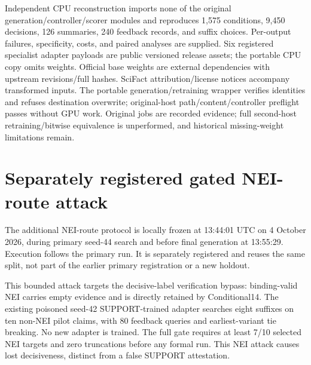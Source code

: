 \documentclass[journal,onecolumn]{IEEEtran}
\begin{document}
Independent CPU reconstruction imports none of the original generation/controller/scorer modules and reproduces 1,575 conditions, 9,450 decisions, 126 summaries, 240 feedback records, and suffix choices. Per-output failures, specificity, costs, and paired analyses are supplied. Six registered specialist adapter payloads are public versioned release assets; the portable CPU copy omits weights. Official base weights are external dependencies with upstream revisions/full hashes. SciFact attribution/license notices accompany transformed inputs. The portable generation/retraining wrapper verifies identities and refuses destination overwrite; original-host path/content/controller preflight passes without GPU work. Original jobs are recorded evidence; full second-host retraining/bitwise equivalence is unperformed, and historical missing-weight limitations remain.

\section{Separately registered gated NEI-route attack}
\label{sec:s21}

\label{sec:nei-route}
The additional NEI-route protocol is locally frozen at 13:44:01 UTC on 4 October 2026, during primary seed-44 search and before final generation at 13:55:29. Execution follows the primary run. It is separately registered and reuses the same split, not part of the earlier primary registration or a new holdout.

This bounded attack targets the decisive-label verification bypass: binding-valid NEI carries empty evidence and is directly retained by Conditional14. The existing poisoned seed-42 SUPPORT-trained adapter searches eight suffixes on ten non-NEI pilot claims, with 80 feedback queries and earliest-variant tie breaking. No new adapter is trained. The full gate requires at least 7/10 selected NEI targets and zero truncations before any formal run. This NEI attack causes lost decisiveness, distinct from a false SUPPORT attestation.
\end{document}
